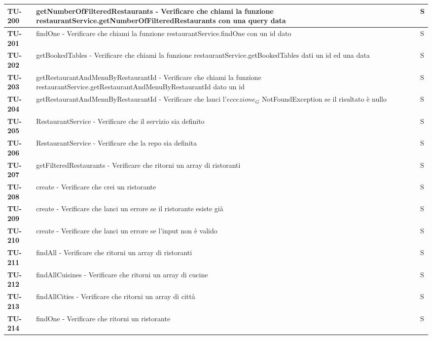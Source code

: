 \begin{longtable}{|>{\centering\arraybackslash}p{2cm}|p{15cm}|p{1cm}|}
  \hline
  \rowcolor{gray!10}
  \textbf{TU-200} & getNumberOfFilteredRestaurants - Verificare che chiami la funzione restaurantService.getNumberOfFilteredRestaurants con una query data & S \\ 
  \hline
  \rowcolor{gray!10}
  \textbf{TU-201} & findOne - Verificare che chiami la funzione restaurantService.findOne con un id dato & S \\ 
  \hline
  \rowcolor{gray!10}
  \textbf{TU-202} & getBookedTables - Verificare che chiami la funzione restaurantService.getBookedTables dati un id ed una data  & S \\ 
  \hline
  \rowcolor{gray!10}
  \textbf{TU-203} & getRestaurantAndMenuByRestaurantId - Verificare che chiami la funzione restaurantService.getRestaurantAndMenuByRestaurantId dato un id & S \\ 
  \hline
  \rowcolor{gray!10}
  \textbf{TU-204} & getRestaurantAndMenuByRestaurantId - Verificare che lanci l'$\textit{eccezione}_G$ NotFoundException se il risultato è nullo & S \\ 
  \hline
  \rowcolor{gray!10}
  \textbf{TU-205} & RestaurantService - Verificare che il servizio sia definito & S \\ 
  \hline
  \rowcolor{gray!10}
  \textbf{TU-206} & RestaurantService - Verificare che la repo sia definita & S \\ 
  \hline
  \rowcolor{gray!10}
  \textbf{TU-207} & getFilteredRestaurants - Verificare che ritorni un array di ristoranti & S \\ 
  \hline
  \rowcolor{gray!10}
  \textbf{TU-208} & create - Verificare che crei un ristorante & S \\ 
  \hline
  \rowcolor{gray!10}
  \textbf{TU-209} & create - Verificare che lanci un errore se il ristorante esiste già & S \\ 
  \hline  
  \rowcolor{gray!10}
  \textbf{TU-210} & create - Verificare che lanci un errore se l'input non è valido & S \\ 
  \hline  
  \rowcolor{gray!10}
  \textbf{TU-211} & findAll - Verificare che ritorni un array di ristoranti & S \\ 
  \hline  
  \rowcolor{gray!10}
  \textbf{TU-212} & findAllCuisines - Verificare che ritorni un array di cucine & S \\ 
  \hline  
  \rowcolor{gray!10}
  \textbf{TU-213} & findAllCities - Verificare che ritorni un array di città & S \\ 
  \hline  
  \rowcolor{gray!10}
  \textbf{TU-214} & findOne - Verificare che ritorni un ristorante & S \\ 

\end{longtable}

